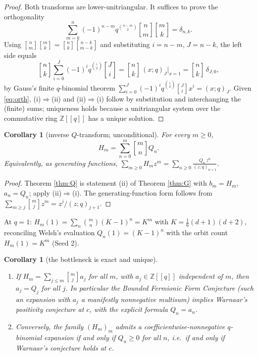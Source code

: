 \documentclass[11pt]{article}
\newtheorem{corollary}[theorem]{Corollary}
\newcommand{\qbin}[2]{\genfrac{[}{]}{0pt}{}{#1}{#2}}
\newcommand{\ZZ}{\mathbb{Z}}
\begin{document}
\begin{proof}
Both transforms are lower-unitriangular. It suffices to prove the orthogonality
\begin{equation}\label{eq:orth}
\sum_{m=k}^{n}(-1)^{n-m}q^{\binom{n-m}{2}}\qbin{n}{m}\qbin{m}{k}=\delta_{n,k}.
\end{equation}
Using $\qbin{n}{m}\qbin{m}{k}=\qbin{n}{k}\qbin{n-k}{m-k}$ and substituting $i=n-m$,
$J=n-k$, the left side equals
\[
\qbin{n}{k}\sum_{i=0}^{J}(-1)^{i}q^{\binom{i}{2}}\qbin{J}{i}
=\qbin{n}{k}\,(x;q)_J\Big|_{x=1}=\qbin{n}{k}\,\delta_{J,0},
\]
by Gauss's finite $q$-binomial theorem
$\sum_{i=0}^J(-1)^iq^{\binom{i}{2}}\qbin{J}{i}x^i=(x;q)_J$. Given \eqref{eq:orth},
(i)$\Rightarrow$(ii) and (ii)$\Rightarrow$(i) follow by substitution and interchanging the
(finite) sums; uniqueness holds because a unitriangular system over the commutative ring
$\ZZ[[q]]$ has a unique solution.
\end{proof}

\begin{corollary}[inverse $Q$-transform; unconditional]\label{cor:I}
For every $m\ge0$,
\[
H_m=\sum_{n=0}^{m}\qbin{m}{n}Q_n .
\]
Equivalently, as generating functions,
$\displaystyle\sum_{m\ge0}H_mz^m=\sum_{n\ge0}\frac{Q_n\,z^n}{(z;q)_{n+1}}$.
\end{corollary}

\begin{proof}
Theorem \ref{thm:Q} is statement (ii) of Theorem \ref{thm:G} with $b_m=H_m$, $a_n=Q_n$;
apply (ii)$\Rightarrow$(i). The generating-function form follows from
$\sum_{m\ge j}\qbin{m}{j}z^m=z^j/(z;q)_{j+1}$.
\end{proof}

At $q=1$: $H_m(1)=\sum_n\binom{m}{n}(K-1)^n=K^m$ with $K=\tfrac16(d+1)(d+2)$, reconciling
Welsh's evaluation $Q_n(1)=(K-1)^n$ with the orbit count $H_m(1)=K^m$ (Seed 2).

\begin{corollary}[the bottleneck is exact and unique]\label{cor:B}
\leavevmode
\begin{enumerate}
\item If $H_m=\sum_{j\le m}\qbin{m}{j}a_j$ for all $m$, with $a_j\in\ZZ[[q]]$ independent
of $m$, then $a_j=Q_j$ for all $j$. In particular the Bounded Fermionic Form Conjecture
(such an expansion with $a_j$ a manifestly nonnegative multisum) implies Warnaar's
positivity conjecture at $c$, with the explicit formula $Q_n=a_n$.
\item Conversely, the family $(H_m)_m$ admits a coefficientwise-nonnegative
$q$-binomial expansion \emph{if and only if} $Q_n\ge0$ for all $n$, i.e.\ if and only if
Warnaar's conjecture holds at $c$.
\end{enumerate}
\end{corollary}
\end{document}

